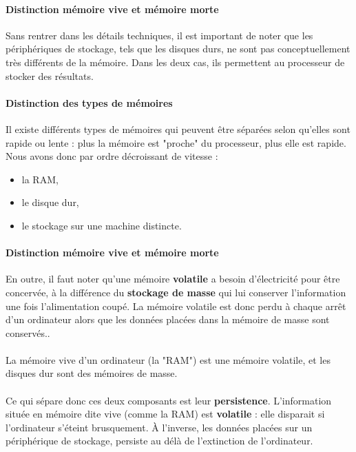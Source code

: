 {  \paragraph{Distinction mémoire vive et mémoire morte} Sans rentrer dans les détails techniques, il
  est important de noter que les périphériques de stockage, tels que les disques durs, ne sont pas 
  conceptuellement très différents de la mémoire. Dans les deux cas, ils permettent au processeur de 
  stocker des résultats.

  \paragraph{Distinction des types de mémoires} Il existe différents types de mémoires qui peuvent 
  être séparées selon qu'elles sont rapide ou lente : plus la mémoire est "proche" du processeur, 
  plus elle est rapide. Nous avons donc par ordre décroissant de vitesse : 

  \begin{itemize}
    \item la RAM,
    \item le disque dur,
    \item le stockage sur une machine distincte.
  \end{itemize}

  \paragraph{Distinction mémoire vive et mémoire morte}  En outre, il faut noter qu'une mémoire 
  \textbf{volatile} a besoin d'électricité pour être concervée, à la différence du \textbf{stockage 
  de masse} qui lui conserver l'information une fois l'alimentation coupé. La mémoire volatile est 
 donc perdu à chaque arrêt d'un ordinateur alors que les données placées dans la mémoire de masse 
 sont conservés.. 

  \paragraph{} La mémoire vive d'un ordinateur (la "RAM") est une mémoire volatile, et les disques 
  dur sont des mémoires de masse.

  \paragraph{} Ce qui sépare donc ces deux composants est leur \textbf{persistence}. L'information
  située en mémoire dite vive (comme la RAM) est \textbf{volatile} : elle disparait si l'ordinateur s'éteint brusquement. À
  l'inverse, les données placées sur un périphérique de stockage, persiste au délà de l'extinction de
  l'ordinateur.
}

